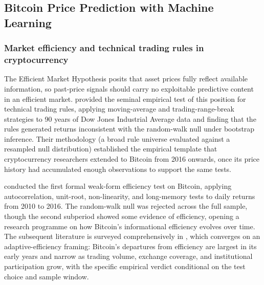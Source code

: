 \subsection{Bitcoin Price Prediction with Machine Learning}\label{subsec:lit_btc}

\subsubsection{Market efficiency and technical trading rules in cryptocurrency}\label{subsubsec:btc_emh}

The Efficient Market Hypothesis \citep{fama_1970} posits that asset prices fully reflect available information, so past-price signals should carry no exploitable predictive content in an efficient market. \citet{brock_lakonishok_lebaron_1992} provided the seminal empirical test of this position for technical trading rules, applying moving-average and trading-range-break strategies to 90 years of Dow Jones Industrial Average data and finding that the rules generated returns inconsistent with the random-walk null under bootstrap inference. Their methodology (a broad rule universe evaluated against a resampled null distribution) established the empirical template that cryptocurrency researchers extended to Bitcoin from 2016 onwards, once its price history had accumulated enough observations to support the same tests.

\citet{urquhart_2016} conducted the first formal weak-form efficiency test on Bitcoin, applying autocorrelation, unit-root, non-linearity, and long-memory tests to daily returns from 2010 to 2016. The random-walk null was rejected across the full sample, though the second subperiod showed some evidence of efficiency, opening a research programme on how Bitcoin's informational efficiency evolves over time. The subsequent literature is surveyed comprehensively in \citet{bariviera_merediz_sola_2021}, which converges on an adaptive-efficiency framing: Bitcoin's departures from efficiency are largest in its early years and narrow as trading volume, exchange coverage, and institutional participation grow, with the specific empirical verdict conditional on the test choice and sample window.

